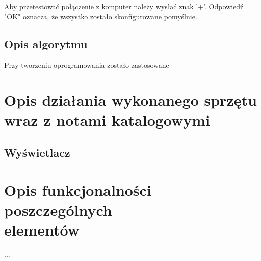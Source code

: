 \documentclass{article}
\begin{document}
Aby przetestować połączenie z komputer należy wysłać znak '+'. Odpowiedź "OK" oznacza, że wszystko zostało
skonfigurowane pomyślnie.

\subsection{Opis algorytmu}
Przy tworzeniu oprogramowania zostało zastosowane 


\section{Opis działania wykonanego sprzętu\\ wraz z notami katalogowymi}

\subsection{Wyświetlacz }


\section{Opis funkcjonalności poszczególnych \\ elementów}
...







\end{document}
